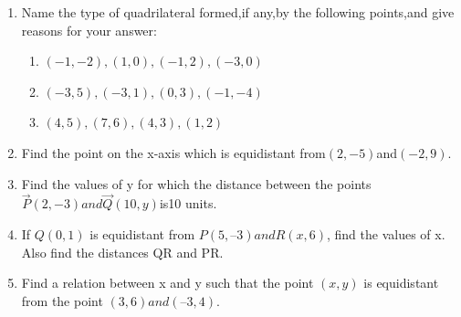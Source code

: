 \documentclass[12pt]{article}
\begin{document}
\begin{enumerate}
\item Name the type of quadrilateral formed,if any,by the following points,and give reasons for your answer:
\begin{enumerate}
\item $(-1,-2),(1,0),(-1,2),(-3,0)$
\item $(-3,5),(-3,1),(0,3),(-1,-4)$
\item $(4,5),(7,6),(4,3),(1,2)$
\end{enumerate}
\item Find the point on the x-axis which is equidistant from$(2,-5)$and$(-2,9)$.
\item Find the values of y for which the distance between the points                  $\vec{P}(2,-3)and \vec{Q}(10,y)$is10 units.
\item  If $Q(0, 1)$ is equidistant from $P(5, –3) and R(x, 6)$, find the values of x. Also find the
distances QR and PR.
\item  Find a relation between x and y such that the point $(x, y)$ is equidistant from the point
$(3, 6) and (– 3, 4)$.

\end{enumerate}
\end{document}
